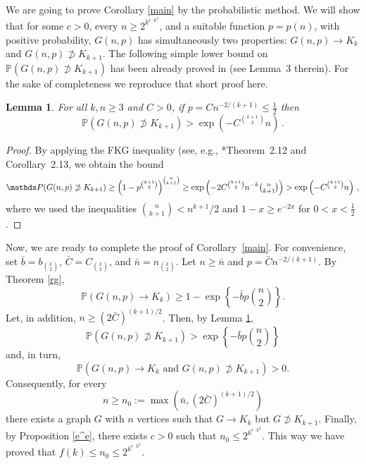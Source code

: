 \documentclass[reqno, 12pt]{amsart}
\newcommand{\PP}{\mathds{P}}
\newtheorem{lemma}[theorem]{Lemma}
\def\PP{\mathds P}
\begin{document}
We are going to prove Corollary \ref{main} by  the
probabilistic method. We will  show that for some $c>0$,  every $n\ge 2^{k^{c\cdot k^2}}$, and  a suitable
function  $p=p(n)$, with positive probability, $G(n,p)$  has simultaneously two properties:
$G(n,p)\rightarrow K_k$ and $G(n,p)\not\supset K_{k+1}$. The following simple lower  bound on
$\PP(G(n,p)\not\supset K_{k+1})$ has been already proved in \cite{folk} (see Lemma~3 therein).
For the sake of completeness we reproduce that short proof here.

\begin{lemma}\label{fkg}
For all $k,n\ge3$ and $C>0$, if $p=Cn^{-2/(k+1)}\le\tfrac12$
then
$$\PP(G(n,p)\not\supset K_{k+1})> \exp(-C^{\binom{k+1}2}n)\,.$$
\end{lemma}

\begin{proof} By applying the FKG inequality (see,
e.g., \cite{JLR}*{Theorem~2.12 and Corollary~2.13},  we obtain the bound
$$\PP(G(n,p)\not\supset K_{k+1})\ge \left(1-p^{\binom{k+1}2}\right)^{\binom n{k+1}}
    \ge
    \exp\left(-2C^{\binom{k+1}2} n^{-k}\tbinom n{k+1}\right)
    >
    \exp\left(-C^{\binom{k+1}2}n\right)\,,$$
where we used the inequalities $\binom n{k+1}< n^{k+1}/2$ and  $1-x\ge e^{-2x}$ for $0<x<\tfrac12$.
\end{proof}

Now, we are ready to complete the proof of Corollary~\ref{main}. For convenience, set $\bar b=b_{\binom k2}$, $\bar
C=C_{\binom k2}$, and $\bar n=n_{\binom k2}$.  Let $n\ge \bar n$ and $p=\bar C n^{-2/(k+1)}$. By
Theorem \ref{rg},
$$\PP(G(n,p)\rightarrow K_k )\ge 1-\exp\left\{-\bar b p\binom n2\right\}.$$
Let, in addition, $n\ge (2\bar C)^{(k+1)/2}$. Then, by Lemma  \ref{fkg},
$$\PP(G(n,p)\not\supset K_{k+1})> \exp\left\{-\bar b p\binom n2\right\}$$
and, in turn,
$$\PP(G(n,p)\rightarrow K_k \mbox{ and }G(n,p)\not\supset K_{k+1})>0.$$
Consequently, for every
$$n\ge n_0:=\max(\bar n,(2\bar C)^{(k+1)/2})$$
 there exists a  graph $G$ with $n$ vertices such that $G\to K_k$ but $G\not\supset K_{k+1}$.
 Finally, by Proposition \ref{e^e}, there exists $c>0$ such that $n_0\le 2^{k^{c\cdot k^2}}$.
 This way we have proved that $f(k)\le n_0\le 2^{k^{c\cdot k^2}}$.
\end{document}
